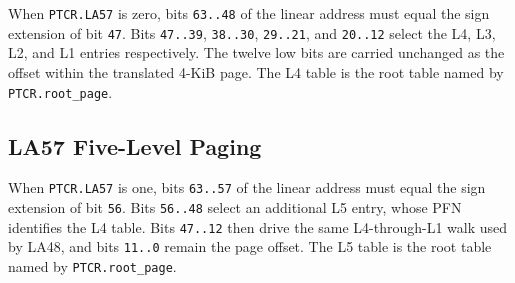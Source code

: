 When \texttt{PTCR.LA57} is zero, bits \texttt{63..48} of the linear address must equal the sign extension of bit
\texttt{47}. Bits \texttt{47..39}, \texttt{38..30}, \texttt{29..21}, and \texttt{20..12} select the L4, L3, L2,
and L1 entries respectively. The twelve low bits are carried unchanged as the offset within the translated 4-KiB
page. The L4 table is the root table named by \texttt{PTCR.root\_page}.



\clearpage
\subsection{LA57 Five-Level Paging}

When \texttt{PTCR.LA57} is one, bits \texttt{63..57} of the linear address must equal the sign extension of bit
\texttt{56}. Bits \texttt{56..48} select an additional L5 entry, whose PFN identifies the L4 table. Bits
\texttt{47..12} then drive the same L4-through-L1 walk used by LA48, and bits \texttt{11..0} remain the page offset.
The L5 table is the root table named by \texttt{PTCR.root\_page}.


